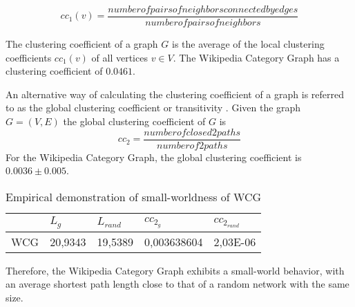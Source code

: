 \begin{equation}\label{eq:cc1}
cc_1(v) = \dfrac{number of pairs of neighbors connected by edges}{number of pairs of neighbors}  
\end{equation} 

The clustering coefficient of a graph $G$ is the average of the local clustering coefficients $cc_1(v)$ of all vertices $v \in V$. The Wikipedia Category Graph has a clustering coefficient of $0.0461$. 

An alternative way of calculating the clustering coefficient of a graph is referred to as the global clustering coefficient or transitivity \cite{newman2001random}. Given the graph $G = (V,E)$ the global clustering coefficient of $G$ is
\begin{equation}\label{eq:cc2}
cc_2 = \dfrac{number of closed 2paths}{number of 2paths}
\end{equation} For the Wikipedia Category Graph, the global clustering coefficient is $0.0036\pm0.005$. 



\begin{table}[!h]
\centering
\begin{tabular}{@{}lllll@{}}
\toprule
    & $L_g$       & $L_{rand}$       & $cc_{2_g}$           & $cc_{2_{rand}}$        \\ \midrule
WCG & 20,9343 & 19,5389 & 0,003638604 & 2,03E-06 \\ \bottomrule
\end{tabular}
\caption{Empirical demonstration of small-worldness of WCG }
\label{small-worldness}
\end{table}

Therefore, the Wikipedia Category Graph exhibits a small-world behavior, with an average shortest path length close to that of a random network with the same size.